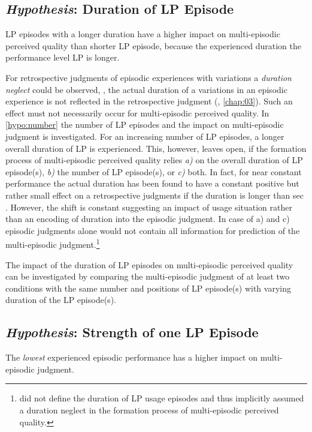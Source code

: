 \subsection{\emph{Hypothesis}: Duration of \ac{LP} Episode}
\begin{hypothesis}\label{hypo:duration}
\ac{LP} episodes with a longer duration have a higher impact on multi-episodic perceived quality than shorter \ac{LP} episode, because the experienced duration the performance level \ac{LP} is longer.
\end{hypothesis}

For retrospective judgments of episodic experiences with variations a \emph{duration neglect} could be observed, \ie, the actual duration of a variations in an episodic experience is not reflected in the retrospective judgment (\cf, \autoref{chap:03}).
Such an effect must not necessarily occur for multi-episodic perceived quality.
In \autoref{hypo:number} the number of \ac{LP} episodes and the impact on multi-episodic judgment is investigated.
For an increasing number of \ac{LP} episodes, a longer overall duration of \ac{LP} is experienced.
This, however, leaves open, if the formation process of multi-episodic perceived quality relies \emph{a)} on the overall duration of \ac{LP} episode(s), \emph{b)} the number of \ac{LP} episode(s), or \emph{c)} both.
In fact, for near constant performance the actual duration has been found to have a constant positive but rather small effect on a retrospective judgments if the duration is longer than \unit[30]{sec} \citep[\cf,][]{frohlich_qoe_2012}.
However, the shift is constant suggesting an impact of usage situation rather than an encoding of duration into the episodic judgment.
In case of a) and c) episodic judgments alone would not contain all information for prediction of the multi-episodic judgment.\footnote{\citet[p. 2]{moller_single-call_2011} did not define the duration of \ac{LP} usage episodes and thus implicitly assumed a duration neglect in the formation process of multi-episodic perceived quality.}

The impact of the duration of \ac{LP} episodes on multi-episodic perceived quality can be investigated by comparing the multi-episodic judgment of at least two conditions with the same number and positions of \ac{LP} episode(s) with varying duration of the \ac{LP} episode(s).

\subsection{\emph{Hypothesis}: Strength of one \ac{LP} Episode}
\begin{hypothesis}\label{hypo:strength}
The \emph{lowest} experienced episodic performance has a higher impact on multi-episodic judgment.
\end{hypothesis}

